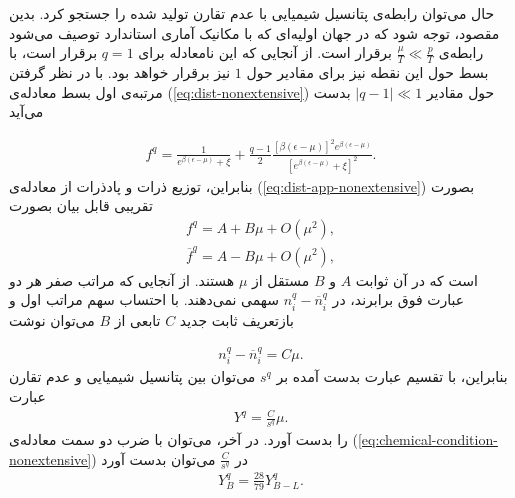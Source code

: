 \documentclass[a4paper]{book}
\begin{document}
حال می‌توان رابطه‌ی پتانسیل شیمیایی با عدم تقارن تولید شده را جستجو کرد. بدین مقصود، توجه شود که در جهان اولیه‌ای که با مکانیک آماری استاندارد توصیف می‌شود رابطه‌ی {\footnotesize$\frac{\mu}{T} \ll \frac{p}{T}$} برقرار است. از آنجایی که این نامعادله برای {\footnotesize$q=1$} برقرار است، با بسط حول این نقطه نیز برای مقادیر حول {\footnotesize$1$} نیز برقرار خواهد بود. با در نظر گرفتن مرتبه‌ی اول بسط معادله‌ی (\ref{eq:dist-nonextensive}) حول مقادیر {\footnotesize$|q-1|\ll1$} بدست می‌آید
\par
\vspace{-0.5cm}
{\footnotesize\begin{align}
	f^{q} = \frac{1}{e^{\beta \left(\epsilon-\mu\right)}+ \xi} + \frac{q-1}{2} \frac{\left[\beta \left(\epsilon-\mu\right)\right]^2 e^{\beta \left(\epsilon-\mu\right)}}{\left[e^{\beta \left(\epsilon-\mu\right)}+\xi\right]^2}.
	\label{eq:dist-app-nonextensive}
\end{align}}
بنابراین، توزیع ذرات و پادذرات از معادله‌ی (\ref{eq:dist-app-nonextensive}) بصورت تقریبی قابل بیان بصورت
{\footnotesize\begin{align}
	f^q = A + B \mu + O(\mu^2),\\
	\overline{f}^q = A - B \mu + O(\mu^2),
\end{align}}
است که در آن ثوابت {\footnotesize$A$} و {\footnotesize$B$} مستقل از {\footnotesize$\mu$} هستند. از آنجایی که مراتب صفر هر دو عبارت فوق برابرند، در {\footnotesize$n^q_i - \overline{n}_i^q$} سهمی نمی‌دهند. با احتساب سهم مراتب اول و بازتعریف ثابت جدید {\footnotesize$C$} تابعی از {\footnotesize$B$} می‌توان نوشت
\par
\vspace{-0.5cm}
{\footnotesize\begin{align}
	n^q_i - \overline{n}_i^q = C \mu.
\end{align}} 
بنابراین،‌ با تقسیم عبارت بدست آمده بر {\footnotesize$s^q$} می‌توان بین پتانسیل شیمیایی و عدم تقارن عبارت
{\footnotesize\begin{align}
	Y^q = \frac{C}{s^q} \mu.
\end{align}}
را بدست آورد. در آخر، می‌توان با ضرب دو سمت معادله‌ی (\ref{eq:chemical-condition-nonextensive}) در {\footnotesize$\frac{C}{s^q}$} می‌توان بدست آورد
{\footnotesize\begin{align}
	Y_{B}^q = \frac{28}{79} Y^q_{B-L}.
	\label{eq:relation-between-B-L-and-baryon-asymmetry-nonextensive}
\end{align}}
\end{document}
